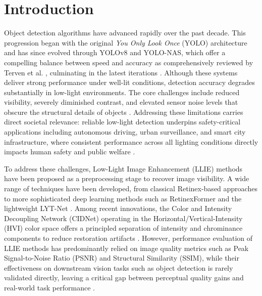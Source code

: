 \documentclass[conference]{IEEEtran}
\begin{document}

\section{Introduction}
Object detection algorithms have advanced rapidly over the past decade. This progression began with the original \textit{You Only Look Once} (YOLO) architecture \cite{redmon2016yolo} and has since evolved through YOLOv8 and YOLO-NAS, which offer a compelling balance between speed and accuracy as comprehensively reviewed by Terven et al. \cite{terven2023yoloreview}, culminating in the latest iterations \cite{sapkota2025yoloreview}. Although these systems deliver strong performance under well-lit conditions, detection accuracy degrades substantially in low-light environments. The core challenges include reduced visibility, severely diminished contrast, and elevated sensor noise levels that obscure the structural details of objects \cite{loh2019exdark,hong2021lowlight}. Addressing these limitations carries direct societal relevance: reliable low-light detection underpins safety-critical applications including autonomous driving, urban surveillance, and smart city infrastructure, where consistent performance across all lighting conditions directly impacts human safety and public welfare \cite{liang2022edgeyolo}.

To address these challenges, Low-Light Image Enhancement (LLIE) methods have been proposed as a preprocessing stage to recover image visibility. A wide range of techniques have been developed, from classical Retinex-based approaches to more sophisticated deep learning methods such as RetinexFormer \cite{cai2023retinexformer} and the lightweight LYT-Net \cite{brateanu2025lytnet}. Among recent innovations, the Color and Intensity Decoupling Network (CIDNet) operating in the Horizontal/Vertical-Intensity (HVI) color space offers a principled separation of intensity and chrominance components to reduce restoration artifacts \cite{yan2025hvi}. However, performance evaluation of LLIE methods has predominantly relied on image quality metrics such as Peak Signal-to-Noise Ratio (PSNR) and Structural Similarity (SSIM), while their effectiveness on downstream vision tasks such as object detection is rarely validated directly, leaving a critical gap between perceptual quality gains and real-world task performance \cite{wu2024llieeffect,liu2021benchmark}.
\end{document}
